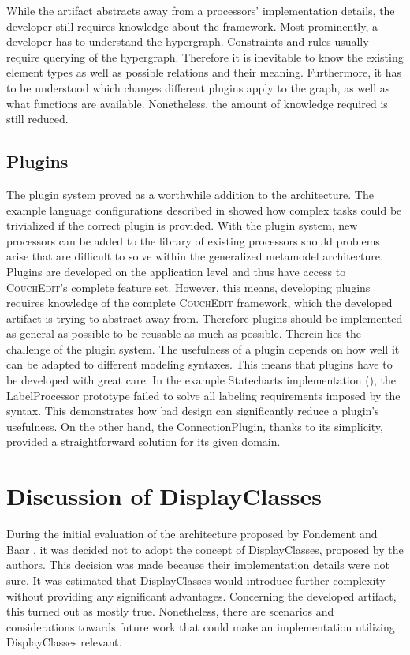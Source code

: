 While the artifact abstracts away from a processors' implementation details, the developer still requires knowledge about the framework. Most prominently, a developer has to understand the hypergraph. Constraints and rules usually require querying of the hypergraph. Therefore it is inevitable to know the existing element types as well as possible relations and their meaning. Furthermore, it has to be understood which changes different plugins apply to the graph, as well as what functions are available. Nonetheless, the amount of knowledge required is still reduced.

\subsection{Plugins}
The plugin system proved as a worthwhile addition to the architecture. The example language configurations described in  showed how complex tasks could be trivialized if the correct plugin is provided. With the plugin system, new processors can be added to the library of existing processors should problems arise that are difficult to solve within the generalized metamodel architecture. Plugins are developed on the application level and thus have access to \textsc{CouchEdit}'s complete feature set. However, this means, developing plugins requires knowledge of the complete \textsc{CouchEdit} framework, which the developed artifact is trying to abstract away from. Therefore plugins should be implemented as general as possible to be reusable as much as possible. Therein lies the challenge of the plugin system. The usefulness of a plugin depends on how well it can be adapted to different modeling syntaxes. This means that plugins have to be developed with great care. In the example Statecharts implementation (), the LabelProcessor prototype failed to solve all labeling requirements imposed by the syntax. This demonstrates how bad design can significantly reduce a plugin's usefulness. On the other hand, the ConnectionPlugin, thanks to its simplicity, provided a straightforward solution for its given domain.

\section{Discussion of DisplayClasses}
\label{sec:dc-disc}
During the initial evaluation of the architecture proposed by Fondement and Baar \cite{fondement_making_2005}, it was decided not to adopt the concept of DisplayClasses, proposed by the authors. This decision was made because their implementation details were not sure. It was estimated that DisplayClasses would introduce further complexity without providing any significant advantages. Concerning the developed artifact, this turned out as mostly true. Nonetheless, there are scenarios and considerations towards future work that could make an implementation utilizing DisplayClasses relevant.

